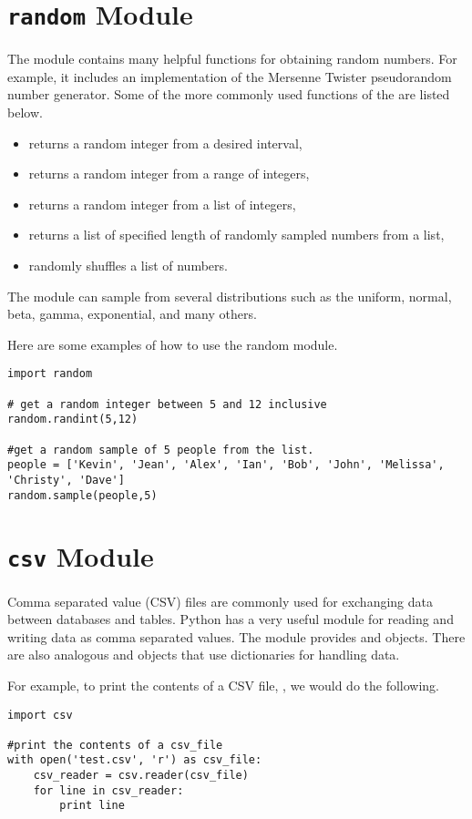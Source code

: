 \section*{\texttt{random} Module}
The  module contains many helpful functions for obtaining random numbers.
For example, it includes an implementation of the Mersenne Twister pseudorandom number generator.
Some of the more commonly used functions of the  are listed below.
\begin{itemize}
\item {} returns a random integer from a desired interval,
\item {} returns a random integer from a range of integers,
\item {} returns a random integer from a list of integers,
\item {} returns a list of specified length of randomly sampled numbers from a list,
\item {} randomly shuffles a list of numbers.
\end{itemize}
The  module can sample from several distributions such as the uniform, normal, beta, gamma, exponential, and many others.

Here are some examples of how to use the random module.
\begin{lstlisting}
import random

# get a random integer between 5 and 12 inclusive
random.randint(5,12)

#get a random sample of 5 people from the list. 
people = ['Kevin', 'Jean', 'Alex', 'Ian', 'Bob', 'John', 'Melissa', 'Christy', 'Dave']
random.sample(people,5)
\end{lstlisting}

\section*{\texttt{csv} Module}
Comma separated value (CSV) files are commonly used for exchanging data between databases and tables. 
Python has a very useful module for reading and writing data as comma separated values.
The  module provides  and  objects.
There are also analogous  and  objects that use dictionaries for handling data.

For example, to print the contents of a CSV file, , we would do the following.
\begin{lstlisting}
import csv

#print the contents of a csv_file
with open('test.csv', 'r') as csv_file:
    csv_reader = csv.reader(csv_file)
    for line in csv_reader:
        print line
\end{lstlisting}

